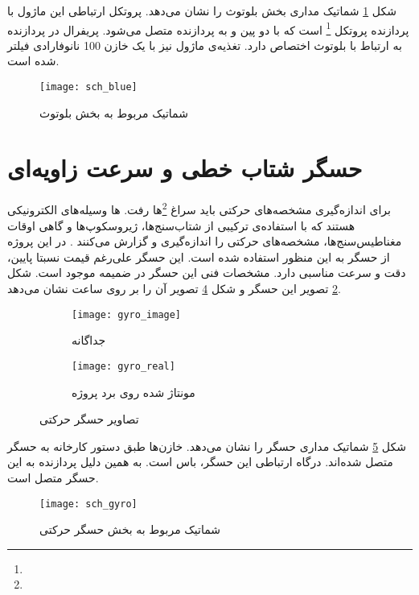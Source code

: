 شکل \ref{fig:sch-blue} شماتیک مداری بخش بلوتوث را نشان می‌دهد. پروتکل ارتباطی این ماژول با پردازنده پروتکل
 \footnote{}
است که با دو پین  و  به پردازنده متصل می‌شود. پریفرال  در پردازنده به ارتباط با بلوتوث اختصاص دارد. تغذیه‌ی ماژول نیز با یک خازن 100 نانوفارادی فیلتر شده است.

\begin{figure}[h]
	\centering
	\texttt{[image: sch\_blue]}
	\caption{شماتیک مربوط به بخش بلوتوث}
	\label{fig:sch-blue}
\end{figure}




\section{حسگر شتاب خطی و سرعت زاویه‌ای}
برای اندازه‌گیری مشخصه‌های حرکتی باید سراغ
\footnote{}ها
رفت. ها وسیله‌های الکترونیکی هستند که با استفاده‌ی ترکیبی از شتاب‌سنج‌ها، ژیروسکوپ‌ها و گاهی اوقات مغناطیس‌سنج‌ها، مشخصه‌های حرکتی را اندازه‌گیری و گزارش می‌کنند \cite{IMU}. در این پروژه از حسگر  به این منظور استفاده شده است. این حسگر علی‌رغم قیمت نسبتا پایین، دقت و سرعت مناسبی دارد. مشخصات فنی این حسگر در ضمیمه  موجود است. شکل \ref{fig:gyro_image} تصویر این حسگر و شکل \ref{fig:gyro_real} تصویر آن را بر روی \pcbf ساعت نشان می‌دهد.

\begin{figure}[h]
	\centering
	\begin{subfigure}{0.5\textwidth}
		\centering
		\texttt{[image: gyro\_image]}
		\caption{جداگانه}
		\label{fig:gyro_image}
	\end{subfigure}
	\begin{subfigure}{0.44\textwidth}
		\centering
		\texttt{[image: gyro\_real]}
		\caption{مونتاژ شده روی برد پروژه}
		\label{fig:gyro_real}
	\end{subfigure}
	\caption{تصاویر حسگر حرکتی}
\end{figure}

شکل \ref{fig:sch-gyro} شماتیک مداری حسگر  را نشان می‌دهد. خازن‌ها طبق دستور کارخانه به حسگر متصل شده‌اند. درگاه ارتباطی این حسگر، باس  است. به همین دلیل  پردازنده به این حسگر متصل است.

\begin{figure}[h]
	\centering
	\texttt{[image: sch\_gyro]}
	\caption{شماتیک مربوط به بخش حسگر حرکتی}
	\label{fig:sch-gyro}
\end{figure}

